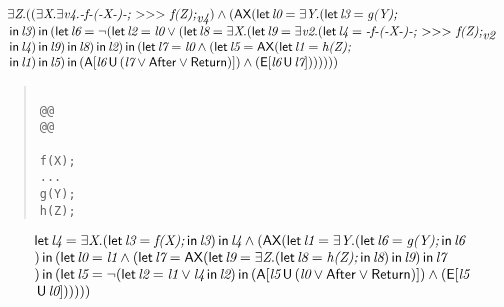 \documentclass{article}
\newcommand{\U}{\,\mbox{\sf{U}}\,}
\newcommand{\A}{\mbox{\sf{A}}}
\newcommand{\E}{\mbox{\sf{E}}}
\newcommand{\AX}{\mbox{\sf{AX}}}
\newcommand{\mita}[1]{\mbox{\it{{#1}}}}
\newcommand{\msf}[1]{\mbox{\sf{{#1}}}}
\newcommand{\mth}[1]{\({#1}\)}
\begin{document}
\[\begin{array}{l}
\exists \mita{Z} . ((\exists \mita{X} . \exists \mita{v4} . \mita{-f-(-X-)-;
  \mth{>}\mth{>}\mth{>} f(Z);}_{\mita{v4}}) \wedge (\AX(\mita{\sf{let}} \, \mita{l0} = \exists \mita{Y} . (\mita{\sf{let}} \, \mita{l3} = \mita{g(Y);}\\\mbox{} \, \mita{\sf{in}} \, \mita{l3}
) \, \mita{\sf{in}} \, (\mita{\sf{let}} \, \mita{l6} = \neg (\mita{\sf{let}} \, \mita{l2} = \mita{l0} \vee (\mita{\sf{let}} \, \mita{l8} = \exists \mita{X} . (\mita{\sf{let}} \, \mita{l9} = \exists \mita{v2} . (\mita{\sf{let}} \, \mita{l4} = \mita{-f-(-X-)-;
  \mth{>}\mth{>}\mth{>} f(Z);}_{\mita{v2}}\\\mbox{} \, \mita{\sf{in}} \, \mita{l4}
) \, \mita{\sf{in}} \, \mita{l9}
) \, \mita{\sf{in}} \, \mita{l8}
) \, \mita{\sf{in}} \, \mita{l2}
) \, \mita{\sf{in}} \, (\mita{\sf{let}} \, \mita{l7} = \mita{l0} \wedge (\mita{\sf{let}} \, \mita{l5} = \AX(\mita{\sf{let}} \, \mita{l1} = \mita{h(Z);}\\\mbox{} \, \mita{\sf{in}} \, \mita{l1}
) \, \mita{\sf{in}} \, \mita{l5}
) \, \mita{\sf{in}} \, (\A[\mita{l6} \U (\mita{l7} \vee \msf{After} \vee \msf{Return})]
) \wedge (\E[\mita{l6} \U \mita{l7}]
)
)
)
)))
\end{array}\]

\begin{quote}\begin{verbatim}

@@
@@

f(X);
...
g(Y);
h(Z);
\end{verbatim}\end{quote}

\[\begin{array}{l}
\mita{\sf{let}} \, \mita{l4} = \exists \mita{X} . (\mita{\sf{let}} \, \mita{l3} = \mita{f(X);} \, \mita{\sf{in}} \, \mita{l3}
) \, \mita{\sf{in}} \, \mita{l4} \wedge (\AX(\mita{\sf{let}} \, \mita{l1} = \exists \mita{Y} . (\mita{\sf{let}} \, \mita{l6} = \mita{g(Y);} \, \mita{\sf{in}} \, \mita{l6}\\\mbox{}
) \, \mita{\sf{in}} \, (\mita{\sf{let}} \, \mita{l0} = \mita{l1} \wedge (\mita{\sf{let}} \, \mita{l7} = \AX(\mita{\sf{let}} \, \mita{l9} = \exists \mita{Z} . (\mita{\sf{let}} \, \mita{l8} = \mita{h(Z);} \, \mita{\sf{in}} \, \mita{l8}
) \, \mita{\sf{in}} \, \mita{l9}
) \, \mita{\sf{in}} \, \mita{l7}\\\mbox{}
) \, \mita{\sf{in}} \, (\mita{\sf{let}} \, \mita{l5} = \neg (\mita{\sf{let}} \, \mita{l2} = \mita{l1} \vee \mita{l4} \, \mita{\sf{in}} \, \mita{l2}
) \, \mita{\sf{in}} \, (\A[\mita{l5} \U (\mita{l0} \vee \msf{After} \vee \msf{Return})]
) \wedge (\E[\mita{l5}\\\mbox{} \U \mita{l0}]
)
)
)
))

\end{array}\]
\end{document}
